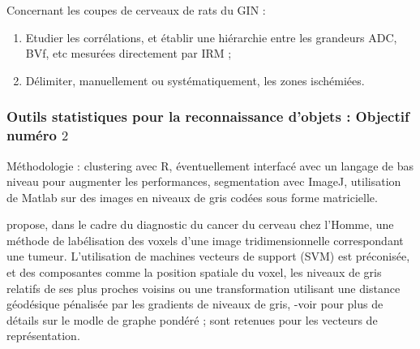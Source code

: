 Concernant les coupes de cerveaux de rats du GIN :

\begin{enumerate}[label=\textbf{(Objectif\ \arabic*)}]
\item Etudier les corr\'elations, et \'etablir une hi\'erarchie entre les grandeurs ADC, BVf, etc mesur\'ees directement par IRM ;
\item D\'elimiter, manuellement ou syst\'ematiquement, les zones isch\'emi\'ees.
\end{enumerate}

\subsubsection{Outils statistiques pour la reconnaissance d'objets : Objectif num\'ero $2$}

M\'ethodologie : clustering avec R, \'eventuellement interfac\'e avec un langage de bas niveau pour augmenter les performances, %
segmentation avec ImageJ, utilisation de Matlab sur des images en niveaux de gris cod\'ees sous forme matricielle.

\etoile
\cite{dol_cmi_16} propose, dans le cadre du diagnostic du cancer du cerveau chez l'Homme, une m\'ethode de lab\'elisation des voxels d'une image tridimensionnelle %
correspondant  une tumeur. %
L'utilisation de machines  vecteurs de support (SVM) est pr\'econis\'ee, et des composantes comme la position spatiale du voxel, %
les niveaux de gris relatifs de ses plus proches voisins ou une transformation utilisant une distance g\'eod\'esique p\'enalis\'ee par les gradients de niveaux de gris, %
-voir \cite{wei_geo_08} pour plus de d\'etails sur le modle de graphe pond\'er\'e ; sont retenues pour les vecteurs de repr\'esentation.

\par


